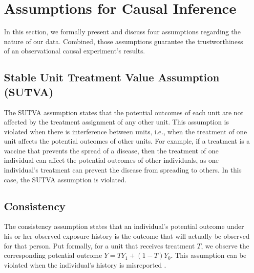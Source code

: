 \documentclass[11pt]{article}
\newcommand{\todo}[1]{{\color{orange}{TODO: #1}}}
\newcommand{\gur}[1]{{\color{teal}{Gur: #1}}}
\begin{document}
\section{Assumptions for Causal Inference}


In this section, we formally present and discuss four assumptions regarding the nature of our data. Combined, those assumptions guarantee the trustworthiness of an observational causal experiment's results.

\subsection{Stable Unit Treatment Value Assumption (SUTVA)}

The SUTVA assumption states that the potential outcomes of each unit are not affected by the treatment assignment of any other unit. This assumption is violated when there is interference between units, i.e., when the treatment of one unit affects the potential outcomes of other units. For example, if a treatment is a vaccine that prevents the spread of a disease, then the treatment of one individual can affect the potential outcomes of other individuals, as one individual's treatment can prevent the disease from spreading to others. In this case, the SUTVA assumption is violated.

\todo{In our data...}

\subsection{Consistency}

The consistency assumption states that an individual's potential outcome under his or her observed exposure history is the outcome that will actually be observed for that person. Put formally, for a unit that receives treatment $T$, we observe the corresponding potential outcome $Y = TY_1 + (1-T)Y_0$. This assumption can be violated when the individual's history is misreported \gur{(e.g., "Have you ever tried LSD?)}.
\end{document}
